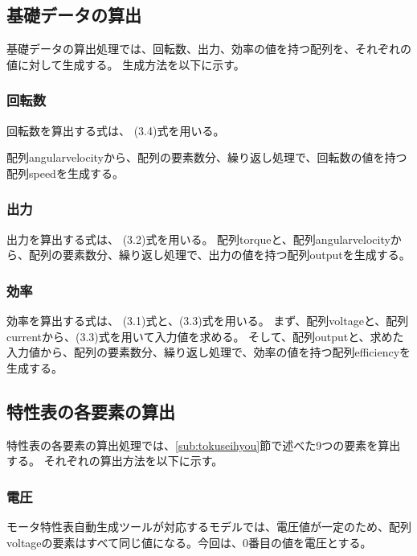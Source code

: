 \subsection{基礎データの算出}\label{sub:youso_kiso}
基礎データの算出処理では、回転数、出力、効率の値を持つ配列を、それぞれの値に対して生成する。
生成方法を以下に示す。

\subsubsection{回転数}\label{sub:sub:kaiten}
回転数を算出する式は、%
(3.4)式を用いる。

配列angularvelocityから、配列の要素数分、繰り返し処理で、回転数の値を持つ配列speedを生成する。

\subsubsection{出力}\label{sub:sub:syutu}
出力を算出する式は、%
(3.2)式を用いる。
配列torqueと、配列angularvelocityから、配列の要素数分、繰り返し処理で、出力の値を持つ配列outputを生成する。

\subsubsection{効率}\label{sub:sub:kouritu}
効率を算出する式は、%
(3.1)式と、(3.3)式を用いる。
まず、配列voltageと、配列currentから、(3.3)式を用いて入力値を求める。
そして、配列outputと、求めた入力値から、配列の要素数分、繰り返し処理で、効率の値を持つ配列efficiencyを生成する。

\subsection{特性表の各要素の算出}\label{sub:youso_mortoku}
特性表の各要素の算出処理では、\ref{sub:tokuseihyou}節で述べた9つの要素を算出する。
それぞれの算出方法を以下に示す。

\subsubsection{電圧}\label{sub:sub:dennatu}
モータ特性表自動生成ツールが対応するモデルでは、電圧値が一定のため、配列voltageの要素はすべて同じ値になる。今回は、0番目の値を電圧とする。

